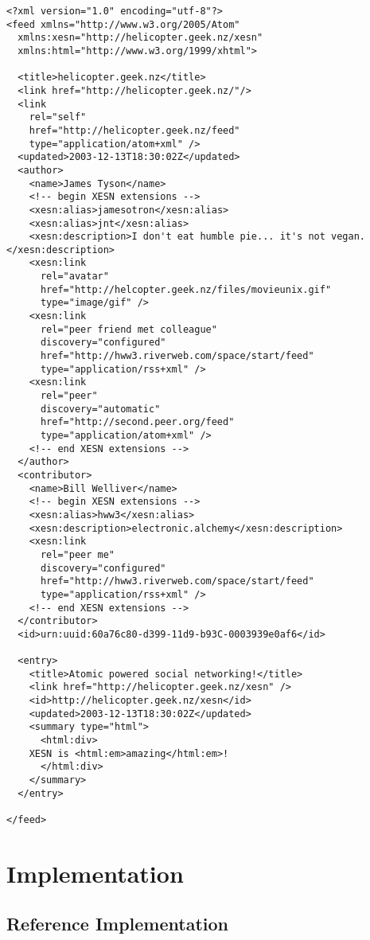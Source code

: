 \documentclass[titlepage,english,a4paper,twoside,dvips]{article}
\begin{document}
\begin{verbatim}
<?xml version="1.0" encoding="utf-8"?>
<feed xmlns="http://www.w3.org/2005/Atom" 
  xmlns:xesn="http://helicopter.geek.nz/xesn"
  xmlns:html="http://www.w3.org/1999/xhtml">

  <title>helicopter.geek.nz</title>
  <link href="http://helicopter.geek.nz/"/>
  <link 
    rel="self" 
    href="http://helicopter.geek.nz/feed" 
    type="application/atom+xml" />
  <updated>2003-12-13T18:30:02Z</updated>
  <author>
    <name>James Tyson</name>
    <!-- begin XESN extensions -->
    <xesn:alias>jamesotron</xesn:alias>
    <xesn:alias>jnt</xesn:alias>
    <xesn:description>I don't eat humble pie... it's not vegan.</xesn:description>
    <xesn:link
      rel="avatar"
      href="http://helcopter.geek.nz/files/movieunix.gif"
      type="image/gif" />
    <xesn:link 
      rel="peer friend met colleague"
      discovery="configured"
      href="http://hww3.riverweb.com/space/start/feed"
      type="application/rss+xml" />
    <xesn:link 
      rel="peer"
      discovery="automatic"
      href="http://second.peer.org/feed" 
      type="application/atom+xml" />
    <!-- end XESN extensions -->
  </author>
  <contributor>
    <name>Bill Welliver</name>
    <!-- begin XESN extensions -->
    <xesn:alias>hww3</xesn:alias>
    <xesn:description>electronic.alchemy</xesn:description>
    <xesn:link 
      rel="peer me"
      discovery="configured"
      href="http://hww3.riverweb.com/space/start/feed"
      type="application/rss+xml" />
    <!-- end XESN extensions -->
  </contributor>
  <id>urn:uuid:60a76c80-d399-11d9-b93C-0003939e0af6</id>

  <entry>
    <title>Atomic powered social networking!</title>
    <link href="http://helicopter.geek.nz/xesn" />
    <id>http://helicopter.geek.nz/xesn</id>
    <updated>2003-12-13T18:30:02Z</updated>
    <summary type="html">
      <html:div>
	XESN is <html:em>amazing</html:em>!
      </html:div>
    </summary>
  </entry>

</feed>
\end{verbatim}

\clearpage

\section{Implementation}

\subsection{Reference Implementation}
\end{document}
